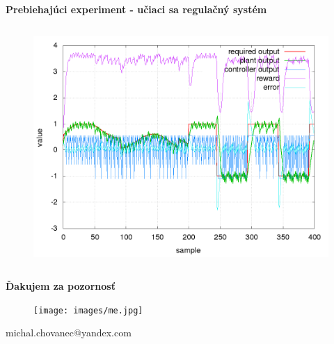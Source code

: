 \documentclass[xcolor=dvipsnames]{beamer}
\begin{document}
\begin{frame}[fragile]{\bf Prebiehajúci experiment - učiaci sa regulačný systém}
\begin{columns}
\begin{column}{0.5\textwidth}
\begin{figure}[ht]
            \begin{center}
            \includegraphics[width=1.0\textwidth]{images/response_log.png}
            \end{center}

            \end{figure}

    	\end{column}
    \end{columns}

\end{frame}


\begin{frame}{\bf Ďakujem za pozornosť}

\begin{figure}[ht]
\begin{center}
\begin{minipage}{0.8\linewidth}
\begin{center}
  \texttt{[image: images/me.jpg]}
\end{center}
\end{minipage}
\end{center}
\end{figure}


\centerline{michal.chovanec@yandex.com}

\end{frame}
\end{document}

